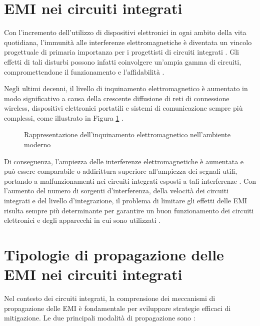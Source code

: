 \section{EMI nei circuiti integrati}
Con l'incremento dell'utilizzo di dispositivi elettronici in ogni ambito della vita quotidiana, l'immunità alle interferenze elettromagnetiche è diventata un vincolo progettuale di primaria importanza per i progettisti di circuiti integrati \cite{Design_considerations_for_an_ultra-low_voltage_amplifier_with_high_EMI_immunity}. Gli effetti di tali disturbi possono infatti coinvolgere un'ampia gamma di circuiti, compromettendone il funzionamento e l'affidabilità \cite{capitolo2}.

Negli ultimi decenni, il livello di inquinamento elettromagnetico è aumentato in modo significativo a causa della crescente diffusione di reti di connessione wireless, dispositivi elettronici portatili e sistemi di comunicazione sempre più complessi, come illustrato in Figura \ref{fig:inquinamento_em} \cite{Design_considerations_for_an_ultra-low_voltage_amplifier_with_high_EMI_immunity}.

\begin{figure}[ht]
    \centering
    \caption{Rappresentazione dell'inquinamento elettromagnetico nell'ambiente moderno}
    \label{fig:inquinamento_em}
\end{figure}

Di conseguenza, l'ampiezza delle interferenze elettromagnetiche è aumentata e può essere comparabile o addirittura superiore all'ampiezza dei segnali utili, portando a malfunzionamenti nei circuiti integrati esposti a tali interferenze \cite{capitolo2}. Con l'aumento del numero di sorgenti d'interferenza, della velocità dei circuiti integrati e del livello d'integrazione, il problema di limitare gli effetti delle EMI risulta sempre più determinante per garantire un buon funzionamento dei circuiti elettronici e degli apparecchi in cui sono utilizzati \cite{Redoute-Richelli_EMC_Magazine}.

\section{Tipologie di propagazione delle EMI nei circuiti integrati}
Nel contesto dei circuiti integrati, la comprensione dei meccanismi di propagazione delle EMI è fondamentale per sviluppare strategie efficaci di mitigazione. Le due principali modalità di propagazione sono \cite{capitolo2}:

